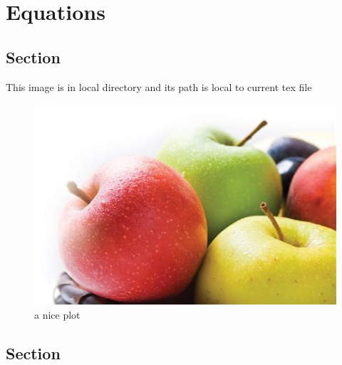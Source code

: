 \chapter{Equations}

   \section{Section}
    This image is in local directory and its path is local to current tex file
        \begin{figure}[h]
            \centering
            \includegraphics{./images/apple.jpeg}
            \caption{a nice plot}
            \label{fig:mesh1}
        \end{figure}

   \section{Section}




